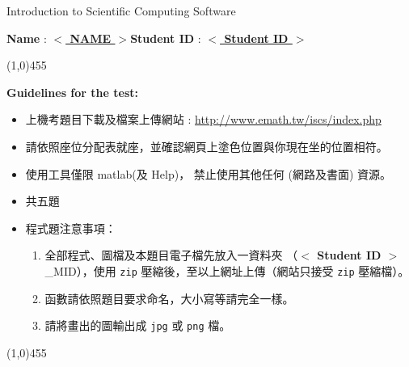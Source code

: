 \documentclass[12pt,a4paper]{article}
\newcommand{\placeholder}[1]{\textbf{$<$ #1 $>$}}
\newcommand{\idnumber}{\placeholder{Student ID}}
\newcommand{\name}{\placeholder{NAME}}
\begin{document}
\begin{center}{\large Introduction to Scientific Computing Software}\end{center}

\begin{center}\textbf{Name} : \underline{ \name{}}\qquad\qquad\qquad\textbf{Student ID} : \underline{ \idnumber{}}\end{center}

\begin{center}
\line(1,0){455}
\end{center}
\textbf{Guidelines for the test:}
\begin{itemize}
\item 上機考題目下載及檔案上傳網站 : \url{http://www.emath.tw/iscs/index.php}
\item 請依照座位分配表就座，並確認網頁上塗色位置與你現在坐的位置相符。
\item 使用工具僅限 matlab(及 Help)， 禁止使用其他任何 (網路及書面) 資源。
\item 共五題
\item 程式題注意事項：
\begin{enumerate}
\item 全部程式、圖檔及本題目電子檔先放入一資料夾 （\idnumber{}\_MID），使用 \texttt{zip} 壓縮後，至以上網址上傳（網站只接受 \texttt{zip} 壓縮檔）。
\item 函數請依照題目要求命名，大小寫等請完全一樣。
\item 請將畫出的圖輸出成 \texttt{jpg} 或 \texttt{png} 檔。
\end{enumerate}
\end{itemize}
\begin{center}
\line(1,0){455}
\end{center}

\end{document}
